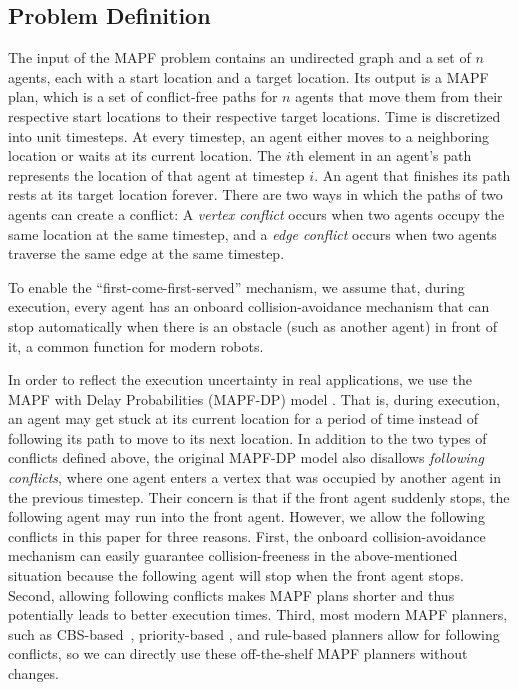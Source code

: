 \documentclass[letterpaper]{article} %
\theoremstyle{definition}
\begin{document}
\subsection{Problem Definition}
The input of the MAPF problem \cite{stern_multi-agent_2021} contains an undirected graph and a set of $n$ agents, each with a start location and a target location. Its output is a MAPF plan, which is a set of conflict-free paths for $n$ agents that move them from their respective start locations to their respective target locations. Time is discretized into unit timesteps. At every timestep, an agent either moves to a neighboring location or waits at its current location. The $i$th element in an agent's path represents the location of that agent at timestep $i$. An agent that finishes its path rests at its target location forever. There are two ways in which the paths of two agents can create a conflict: A \emph{vertex conflict} occurs when two agents occupy the same location at the same timestep, and a \emph{edge conflict} occurs when two agents traverse the same edge at the same timestep.


To enable the ``first-come-first-served'' mechanism, we assume that, during execution, every agent has an onboard collision-avoidance mechanism that can stop automatically when there is an obstacle (such as another agent) in front of it, a common function for modern robots.

In order to reflect the execution uncertainty in real applications, we use the MAPF with Delay Probabilities (MAPF-DP) model \cite{ma_multi-agent_2017}. That is, during execution, an agent may get stuck at its current location for a period of time instead of following its path to move to its next location. In addition to the two types of conflicts defined above, the original MAPF-DP model also disallows \emph{following conflicts}, where one agent enters a vertex that was occupied by another agent in the previous timestep. Their concern is that if the front agent suddenly stops, the following agent may run into the front agent. However, we allow the following conflicts in this paper for three reasons. First, the onboard collision-avoidance mechanism can easily guarantee collision-freeness in the above-mentioned situation because the following agent will stop when the front agent stops. Second, allowing following conflicts makes MAPF plans shorter and thus potentially leads to better execution times. Third, most modern MAPF planners, such as CBS-based~\cite{sharon_conflict-based_2015,gange_lazy_2021,li_eecbs_2021}, priority-based \cite{erdmann_multiple_1986,ma_searching_2019}, and rule-based \cite{sajid_multi-agent_2021,okumura_priority_nodate} planners allow for following conflicts, so we can directly use these off-the-shelf MAPF planners without changes.
\end{document}
